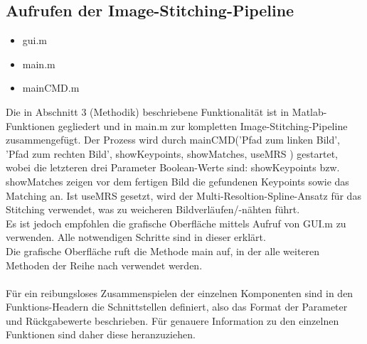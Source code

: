 \documentclass[deutsch]{scrartcl}
\begin{document}
\subsection{Aufrufen der Image-Stitching-Pipeline}
\begin{itemize}
	\item gui.m 
	\item main.m 
	\item mainCMD.m
\end{itemize}
Die in Abschnitt 3 (Methodik) beschriebene Funktionalität ist in
Matlab-Funktionen gegliedert und in main.m zur kompletten
Image-Stitching-Pipeline zusammengefügt. Der Prozess wird durch mainCMD('Pfad
zum linken Bild', 'Pfad zum rechten Bild', showKeypoints, showMatches, useMRS ) gestartet, wobei die letzteren drei Parameter Boolean-Werte sind: showKeypoints bzw. showMatches zeigen vor dem fertigen Bild die gefundenen Keypoints sowie das Matching an. Ist useMRS gesetzt, wird der Multi-Resoltion-Spline-Ansatz für das Stitching verwendet, was zu weicheren Bildverläufen/-nähten führt. \\
Es ist jedoch empfohlen die grafische Oberfläche mittels Aufruf
von GUI.m zu verwenden. Alle notwendigen Schritte sind in dieser erklärt.\\
Die grafische Oberfläche ruft die Methode main auf, in der alle weiteren
Methoden der Reihe nach verwendet werden.\\\\
Für ein reibungsloses Zusammenspielen der einzelnen Komponenten sind in den Funktions-Headern die Schnittstellen definiert, also das Format der Parameter und Rückgabewerte beschrieben. Für genauere Information zu den einzelnen Funktionen sind daher diese heranzuziehen.
\end{document}
